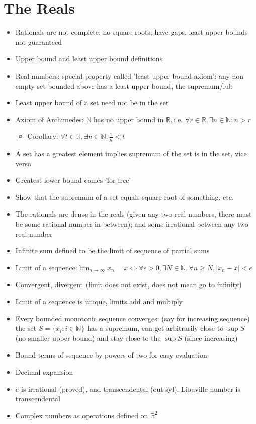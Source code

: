 \documentclass[12pt]{article}
\begin{document}
\section{The Reals}
\begin{itemize}
\item Rationals are not complete: no square roots; have gaps, least upper
bounds not guaranteed
\item Upper bound and least upper bound definitions
\item Real numbers: special property called 'least upper bound axiom': any
non-empty set bounded above has a least upper bound, the supremum/lub
\item Least upper bound of a set need not be in the set
\item Axiom of Archimedes: $\mathbb{N}$ has no upper bound in $\mathbb{R},$i.e.
$\forall r\in\mathbb{R},\exists n\in\mathbb{N}:n>r$
\begin{itemize}
\item Corollary: $\forall t\in\mathbb{R},\exists n\in\mathbb{N}:\frac{1}{n}<t$
\end{itemize}
\item A set has a greatest element implies supremum of the set is in the
set, vice versa
\item Greatest lower bound comes 'for free'
\item Show that the supremum of a set equals square root of something, etc.
\item The rationals are dense in the reals (given any two real numbers,
there must be some rational number in between); and some irrational
between any two real number
\item Infinite sum defined to be the limit of sequence of partial sums
\item Limit of a sequence:${\displaystyle \lim_{n\to\infty}x_{n}=x\iff\forall\epsilon>0,\exists N\in\mathbb{\mathbb{N}},\forall n\geq N,|x_{n}-x|<\epsilon}$
\item Convergent, divergent (limit does not exist, does not mean go to infinity)
\item Limit of a sequence is unique, limits add and multiply
\item Every bounded monotonic sequence converges: (say for increasing sequence)
the set $S=\{x_{i}:i\in\mathbb{N}\}$ has a supremum, can get arbitrarily
close to $\sup S$ (no smaller upper bound) and stay close to the
$\sup S$ (since increasing)
\item Bound terms of sequence by powers of two for easy evaluation
\item Decimal expansion
\item $e$ is irrational (proved), and transcendental (out-syl). Liouville
number is transcendental
\item Complex numbers as operations defined on $\mathbb{R}^{2}$
\end{itemize}
\end{document}
